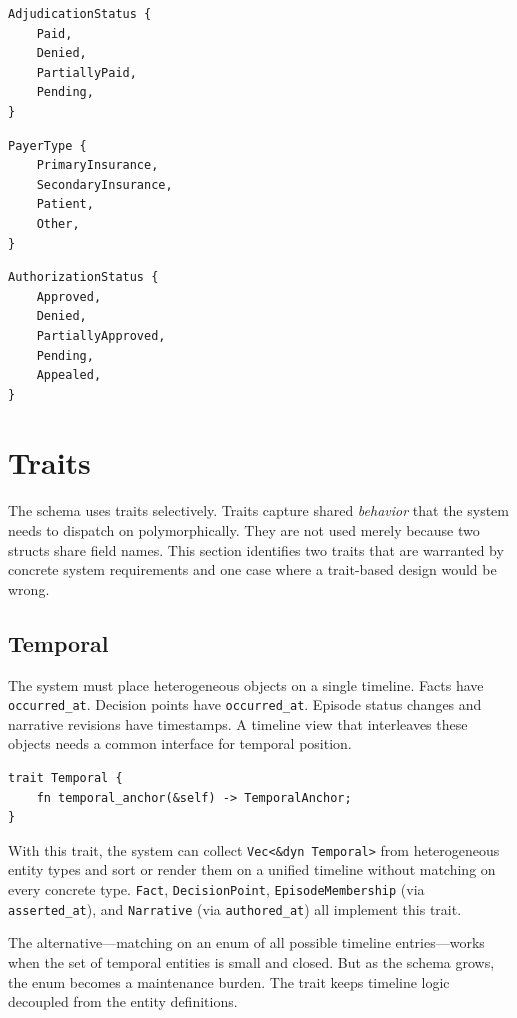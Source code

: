\documentclass[11pt]{article}
\begin{document}
\begin{lstlisting}
AdjudicationStatus {
    Paid,
    Denied,
    PartiallyPaid,
    Pending,
}
\end{lstlisting}

\begin{lstlisting}
PayerType {
    PrimaryInsurance,
    SecondaryInsurance,
    Patient,
    Other,
}
\end{lstlisting}

\begin{lstlisting}
AuthorizationStatus {
    Approved,
    Denied,
    PartiallyApproved,
    Pending,
    Appealed,
}
\end{lstlisting}

\section{Traits}
\label{sec:traits}

The schema uses traits selectively. Traits capture shared \emph{behavior}
that the system needs to dispatch on polymorphically. They are not used
merely because two structs share field names. This section identifies two
traits that are warranted by concrete system requirements and one case where
a trait-based design would be wrong.

\subsection{Temporal}
\label{sec:trait-temporal}

The system must place heterogeneous objects on a single timeline. Facts have
\texttt{occurred\_at}. Decision points have \texttt{occurred\_at}. Episode
status changes and narrative revisions have timestamps. A timeline view
that interleaves these objects needs a common interface for temporal
position.

\begin{lstlisting}
trait Temporal {
    fn temporal_anchor(&self) -> TemporalAnchor;
}
\end{lstlisting}

With this trait, the system can collect \texttt{Vec<\&dyn Temporal>} from
heterogeneous entity types and sort or render them on a unified timeline
without matching on every concrete type. \texttt{Fact}, \texttt{DecisionPoint},
\texttt{EpisodeMembership} (via \texttt{asserted\_at}), and
\texttt{Narrative} (via \texttt{authored\_at}) all implement this trait.

The alternative---matching on an enum of all possible timeline
entries---works when the set of temporal entities is small and closed. But as
the schema grows, the enum becomes a maintenance burden. The trait keeps
timeline logic decoupled from the entity definitions.
\end{document}
